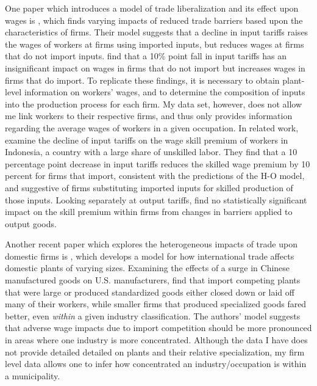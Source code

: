 \documentclass[12pt]{article}
\begin{document}
One paper which introduces a model of trade liberalization and its effect upon wages is \citet{amiti},
which finds varying impacts of reduced trade barriers based upon the characteristics of
firms. Their model suggests that a decline in input tariffs raises the wages of workers at firms
using imported inputs, but reduces wages at firms that do not import inputs. 
\citeauthor{amiti} find that a 10\% point fall in input tariffs has an insignificant impact
on wages in firms that do not import but increases wages in firms that do import. 
To replicate these findings, it is necessary to obtain plant-level information on workers'
wages, and to determine the composition of inputs into the production process for each firm.
My data set, however, does not allow me link workers to their respective firms, and thus only
provides information regarding the average wages of workers in a given occupation. 
In related work, \citet{amiti2012trade} examine the decline of input tariffs on the wage skill
premium of workers in Indonesia, a country with a large share of unskilled labor.
They find that a 10 percentage point decrease in input tariffs reduces the skilled wage premium
by 10 percent for firms that import, consistent with the predictions of the H-O model, and suggestive
of firms substituting imported inputs for skilled production of those inputs. Looking separately at
output tariffs, \citeauthor{amiti2012trade} find no statistically significant impact on the 
skill premium within firms from changes in barriers applied to output goods.

Another recent paper which explores the heterogeneous impacts of trade upon domestic firms is 
\citet{holmes1}, which develops a model for how international trade affects domestic plants of varying sizes. 
Examining the effects of a surge in Chinese manufactured goods on U.S. manufacturers,
\citeauthor{holmes1} find that import competing plants that were large or produced standardized goods 
either closed down or laid off many of their workers, while smaller firms that produced specialized 
goods fared better, even \textit{within} a given industry classification. The authors' 
model suggests that adverse wage impacts due to import competition should be more pronounced in 
areas where one industry is more concentrated. Although the data I have does not provide detailed detailed
on plants and their relative specialization, my firm level data allows one to infer how concentrated an
industry/occupation is within a municipality.
\end{document}

